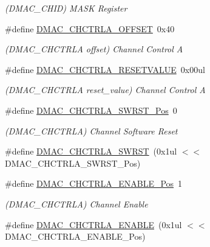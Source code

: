 \begin{DoxyCompactItemize}
\begin{DoxyCompactList}\small\item\em (D\+M\+A\+C\+\_\+\+C\+H\+ID) M\+A\+SK Register \end{DoxyCompactList}\item 
\#define \mbox{\hyperlink{group___s_a_m_d21___d_m_a_c_ga85ef70390b4b949c408381f31817adde}{D\+M\+A\+C\+\_\+\+C\+H\+C\+T\+R\+L\+A\+\_\+\+O\+F\+F\+S\+ET}}~0x40
\begin{DoxyCompactList}\small\item\em (D\+M\+A\+C\+\_\+\+C\+H\+C\+T\+R\+LA offset) Channel Control A \end{DoxyCompactList}\item 
\#define \mbox{\hyperlink{group___s_a_m_d21___d_m_a_c_ga28d42b2361a2edaff8d5ddb89e5f8be5}{D\+M\+A\+C\+\_\+\+C\+H\+C\+T\+R\+L\+A\+\_\+\+R\+E\+S\+E\+T\+V\+A\+L\+UE}}~0x00ul
\begin{DoxyCompactList}\small\item\em (D\+M\+A\+C\+\_\+\+C\+H\+C\+T\+R\+LA reset\+\_\+value) Channel Control A \end{DoxyCompactList}\item 
\#define \mbox{\hyperlink{group___s_a_m_d21___d_m_a_c_gad3c2eb1111a28a2450f5264d0e66d415}{D\+M\+A\+C\+\_\+\+C\+H\+C\+T\+R\+L\+A\+\_\+\+S\+W\+R\+S\+T\+\_\+\+Pos}}~0
\begin{DoxyCompactList}\small\item\em (D\+M\+A\+C\+\_\+\+C\+H\+C\+T\+R\+LA) Channel Software Reset \end{DoxyCompactList}\item 
\#define \mbox{\hyperlink{group___s_a_m_d21___d_m_a_c_ga6dc3b6a2f65f0cab7ee1214749ca2c70}{D\+M\+A\+C\+\_\+\+C\+H\+C\+T\+R\+L\+A\+\_\+\+S\+W\+R\+ST}}~(0x1ul $<$$<$ D\+M\+A\+C\+\_\+\+C\+H\+C\+T\+R\+L\+A\+\_\+\+S\+W\+R\+S\+T\+\_\+\+Pos)
\item 
\#define \mbox{\hyperlink{group___s_a_m_d21___d_m_a_c_gabb1481a4309fd1a6c2456c48db79f393}{D\+M\+A\+C\+\_\+\+C\+H\+C\+T\+R\+L\+A\+\_\+\+E\+N\+A\+B\+L\+E\+\_\+\+Pos}}~1
\begin{DoxyCompactList}\small\item\em (D\+M\+A\+C\+\_\+\+C\+H\+C\+T\+R\+LA) Channel Enable \end{DoxyCompactList}\item 
\#define \mbox{\hyperlink{group___s_a_m_d21___d_m_a_c_gae2f13549f4059e9990a0551e6425543b}{D\+M\+A\+C\+\_\+\+C\+H\+C\+T\+R\+L\+A\+\_\+\+E\+N\+A\+B\+LE}}~(0x1ul $<$$<$ D\+M\+A\+C\+\_\+\+C\+H\+C\+T\+R\+L\+A\+\_\+\+E\+N\+A\+B\+L\+E\+\_\+\+Pos)

\end{DoxyCompactItemize}
